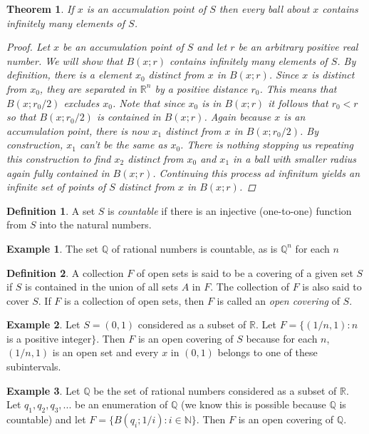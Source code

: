 \documentclass[11pt,a4paper]{report}
\theoremstyle{plain}
\newtheorem{thm}{Theorem}[section]
\theoremstyle{definition}
\newtheorem{defn}{Definition}[section]
\newtheorem{exmp}{Example}[section]
\theoremstyle{remark}
\begin{document}
\begin{thm}
If $x$ is an accumulation point of $S$ then every ball about $x$ contains infinitely many elements of $S$.
\begin{proof}
Let $x$ be an accumulation point of $S$ and let $r$ be an arbitrary positive real number.  We will show that $B(x;r)$ contains infinitely many elements of $S$. By definition, there is a element $x_0$ distinct from $x$ in $B(x;r)$.  Since $x$ is distinct from $x_0$, they are separated in $\mathbb{R}^n$ by a positive distance $r_0$.  This means that $B(x;r_0 / 2)$ excludes $x_0$. Note that since $x_0$ is in $B(x;r)$ it follows that $r_0<r$ so that $B(x;r_0 / 2)$ is contained in $B(x;r)$.  Again because $x$ is an accumulation point, there is now $x_1$ distinct from $x$ in $B(x;r_0 / 2)$.  By construction, $x_1$ can't be the same as $x_0$.  There is nothing stopping us repeating this construction to find $x_2$ distinct from $x_0$ and $x_1$ in a ball with smaller radius again fully contained in $B(x;r)$.  Continuing this process \textit{ad infinitum} yields an infinite set of points of $S$ distinct from $x$ in $B(x;r)$.
\end{proof}
\end{thm}

\begin{defn}
A set $S$ is \textit{countable} if there is an injective (one-to-one) function from $S$ into the natural numbers.
\end{defn}

\begin{exmp}
The set $\mathbb{Q}$ of rational numbers is countable, as is $\mathbb{Q}^n$ for each $n$
\end{exmp}

\begin{defn}
A collection $F$ of open sets is said to be a covering of a given set $S$ if $S$ is contained in the union of all sets $A$ in $F$. The collection of $F$ is also said to cover $S$. If $F$ is a collection of open sets, then $F$ is called an \textit{open covering} of $S$. 
\end{defn}

\begin{exmp}
Let $S = (0,1)$ considered as a subset of $\mathbb{R}$. Let $F = \{(1/n,1) : n$ is a positive integer$\}$. Then $F$ is an open covering of $S$ because for each $n$, $(1/n,1)$ is an open set and every $x$ in $(0,1)$ belongs to one of these subintervals.
\end{exmp}

\begin{exmp}
Let $\mathbb{Q}$ be the set of rational numbers considered as a subset of $\mathbb{R}$.  Let $q_1, q_2, q_3, ...$ be an enumeration of $\mathbb{Q}$ (we know this is possible because $\mathbb{Q}$ is countable) and let $F = \{B(q_i; 1/i) : i \in \mathbb{N}\}$.  Then $F$ is an open covering of $\mathbb{Q}$.
\end{exmp}
\end{document}
